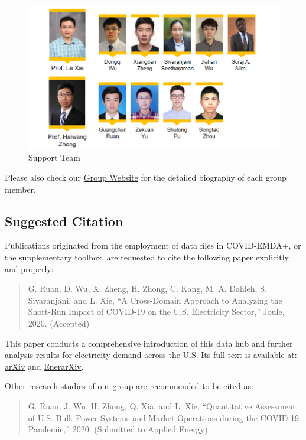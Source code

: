 \documentclass[11pt]{article}
\numberwithin{equation}{section}
\numberwithin{table}{section}
\numberwithin{figure}{section}
\begin{document}
\begin{figure}[!ht]
    \centering
    \includegraphics[width=.8\textwidth]{figures/contributor-extend-20210408.png}
    \caption{Support Team}
\end{figure}

Please also check our \href{https://gridx.engr.tamu.edu/?page_id=30}{Group Website} for the detailed biography of each group member.

\subsection{Suggested Citation}
Publications originated from the employment of data files in COVID-EMDA+, or the supplementary toolbox, are requested to cite the following paper explicitly and properly: 

\begin{quotation}\footnotesize
G. Ruan, D. Wu, X. Zheng, H. Zhong, C. Kang, M. A. Dahleh, S. Sivaranjani, and L. Xie, ``A Cross-Domain Approach to Analyzing the Short-Run Impact of COVID-19 on the U.S. Electricity Sector,'' Joule, 2020. (Accepted)
\end{quotation}

This paper conducts a comprehensive introduction of this data hub and further analysis results for electricity demand across the U.S. Its full text is available at: \href{https://arxiv.org/abs/2005.06631}{arXiv} and \href{http://www.enerarxiv.org/page/thesis.html?id=1840}{EnerarXiv}.

Other research studies of our group are recommended to be cited as:

\begin{quotation}\footnotesize
G. Ruan, J. Wu, H. Zhong, Q. Xia, and L. Xie, ``Quantitative Assessment of U.S. Bulk Power Systems and Market Operations during the COVID-19 Pandemic,'' 2020. (Submitted to Applied Energy)
\end{quotation}
\end{document}
